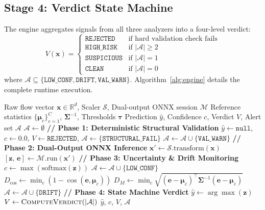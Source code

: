 \documentclass[journal]{IEEEtran}
\newcommand{\sysname}{\textsc{SemanticShield}}
\begin{document}
\subsection{Stage 4: Verdict State Machine}
\label{sec:verdict}
The engine aggregates signals from all three analyzers into a four-level verdict:
\begin{equation}
  V(\mathbf{x}) = \begin{cases}
    \texttt{REJECTED}   & \text{if hard validation check fails} \\
    \texttt{HIGH\_RISK}  & \text{if } |\mathcal{A}| \geq 2 \\
    \texttt{SUSPICIOUS} & \text{if } |\mathcal{A}| = 1 \\
    \texttt{CLEAN}      & \text{if } |\mathcal{A}| = 0
  \end{cases}
  \label{eq:verdict}
\end{equation}
where $\mathcal{A} \subseteq \{\texttt{LOW\_CONF}, \texttt{DRIFT}, \texttt{VAL\_WARN}\}$. Algorithm~\ref{alg:engine} details the complete runtime execution.

\begin{algorithm}[t]
\caption{\sysname{} Runtime Assurance Pipeline}
\label{alg:engine}
\begin{algorithmic}[1]
\REQUIRE Raw flow vector $\mathbf{x} \in \mathbb{R}^d$, Scaler $\mathcal{S}$, Dual-output ONNX session $\mathcal{M}$
\REQUIRE Reference statistics $\{\boldsymbol{\mu}_c\}_{c=1}^C$, $\boldsymbol{\Sigma}^{-1}$, Thresholds $\boldsymbol{\tau}$
\ENSURE Prediction $\hat{y}$, Confidence $c$, Verdict $V$, Alert set $\mathcal{A}$
\STATE $\mathcal{A} \leftarrow \emptyset$
\STATE \textbf{// Phase 1: Deterministic Structural Validation}
  \RETURN $\hat{y} \leftarrow \texttt{null}$, $c \leftarrow 0.0$, $V \leftarrow \texttt{REJECTED}$, $\mathcal{A} \leftarrow \{\texttt{STRUCTURAL\_FAIL}\}$
\ENDIF
{}
  \STATE $\mathcal{A} \leftarrow \mathcal{A} \cup \{\texttt{VAL\_WARN}\}$
\ENDIF
\STATE \textbf{// Phase 2: Dual-Output ONNX Inference}
\STATE $\mathbf{x}' \leftarrow \mathcal{S}.\text{transform}(\mathbf{x})$
\STATE $[\mathbf{z}, \, \mathbf{e}] \leftarrow \mathcal{M}.\text{run}(\mathbf{x}')$ 
\STATE \textbf{// Phase 3: Uncertainty \& Drift Monitoring}
\STATE $c \leftarrow \max(\text{softmax}(\mathbf{z}))$
  \STATE $\mathcal{A} \leftarrow \mathcal{A} \cup \{\texttt{LOW\_CONF}\}$
\ENDIF
\STATE $D_{\cos} \leftarrow \min_{c} (1 - \cos(\mathbf{e}, \boldsymbol{\mu}_c))$
\STATE $D_M \leftarrow \min_{c} \sqrt{(\mathbf{e} - \boldsymbol{\mu}_c)^\top \boldsymbol{\Sigma}^{-1} (\mathbf{e} - \boldsymbol{\mu}_c)}$
  \STATE $\mathcal{A} \leftarrow \mathcal{A} \cup \{\texttt{DRIFT}\}$
\ENDIF
\STATE \textbf{// Phase 4: State Machine Verdict}
\STATE $\hat{y} \leftarrow \arg\max(\mathbf{z})$
\STATE $V \leftarrow \textsc{ComputeVerdict}(|\mathcal{A}|)$ 
\RETURN $\hat{y}$, $c$, $V$, $\mathcal{A}$
\end{algorithmic}
\end{algorithm}
\end{document}
